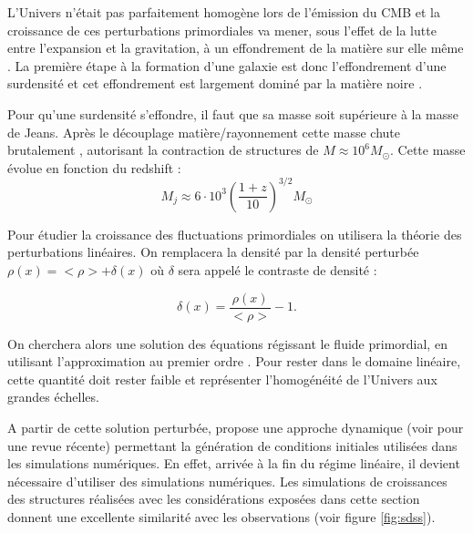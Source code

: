 L'Univers n'était pas parfaitement homogène lors de l'émission du \ac{CMB} et la croissance de ces perturbations primordiales va mener, sous l'effet de la lutte entre l'expansion et la gravitation, à un effondrement de la matière sur elle même \citep{1968ApJ...151..459S}.
La première étape à la formation d'une galaxie est donc l'effondrement d'une surdensité et cet effondrement est largement dominé par la matière noire \citep{1985ApJ...292..371D}.

Pour qu'une surdensité s'effondre, il faut que sa masse soit supérieure à la masse de Jeans.
Après le découplage matière/rayonnement cette masse chute brutalement \citep{2010gfe..book.....M}, autorisant la contraction de structures de $M \approx 10^6 M_\odot$.
Cette masse évolue en fonction du redshift \citep{2016PhR...645....1B} : 
\begin{equation}
M_j \approx 6 \cdot 10 ^3 \left( \frac{1+z}{10} \right)^{3/2} M_\odot
\end{equation}

Pour étudier la croissance des fluctuations primordiales on utilisera la théorie des perturbations linéaires.
On remplacera la densité par la densité perturbée $\rho(x) = <\rho> + \delta(x)$ où $\delta$ sera appelé le contraste de densité :

\begin{equation}
\delta(x) = \frac{\rho(x)}{<\rho>} -1.
\end{equation}

On cherchera alors une solution des équations régissant le fluide primordial, en utilisant l'approximation au premier ordre \citep{1999coph.book.....P}.
Pour rester dans le domaine linéaire, cette quantité doit rester faible et représenter l'homogénéité de l'Univers aux grandes échelles.

A partir de cette solution perturbée, \cite{1970A&A.....5...84Z} propose une approche dynamique (voir \cite{2014MNRAS.439.3630W} pour une revue récente) permettant la génération de conditions initiales utilisées dans les simulations numériques.
En effet, arrivée à la fin du régime linéaire, il devient nécessaire d'utiliser des simulations numériques.
Les simulations de croissances des structures réalisées avec les considérations exposées dans cette section donnent une excellente similarité avec les observations (voir figure \ref{fig:sdss}).

